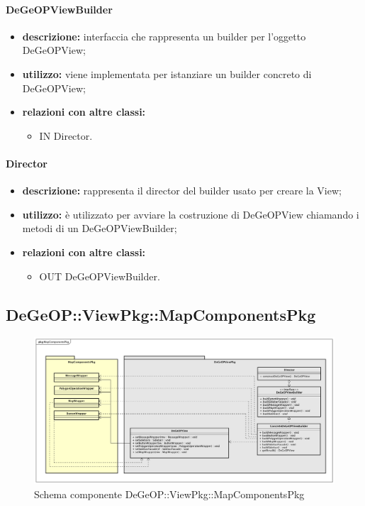 \paragraph{DeGeOPViewBuilder}
\begin{itemize}
	\item \textbf{descrizione:} interfaccia che rappresenta un builder per l'oggetto DeGeOPView;
	\item \textbf{utilizzo:} viene implementata per istanziare un builder concreto di DeGeOPView;
	\item \textbf{relazioni con altre classi:} 
	\begin{itemize}
		\item IN Director.
	\end{itemize}
\end{itemize}
\paragraph{Director}
\begin{itemize}
	\item \textbf{descrizione:} rappresenta il director del  builder usato per creare la View;
	\item \textbf{utilizzo:} è utilizzato per avviare la costruzione di DeGeOPView chiamando i metodi di un DeGeOPViewBuilder;
	\item \textbf{relazioni con altre classi:} 
	\begin{itemize}
		\item OUT DeGeOPViewBuilder.
	\end{itemize}
\end{itemize}
\newpage
\subsection{DeGeOP::ViewPkg::MapComponentsPkg}
\label{pkg::MapComponentsPkg}
\begin{figure}[H]
	\centering
	\includegraphics[width=\textwidth]{img/PkgDiagram/MapComponentsPkg.png}
	\caption{Schema componente DeGeOP::ViewPkg::MapComponentsPkg}
\end{figure}
